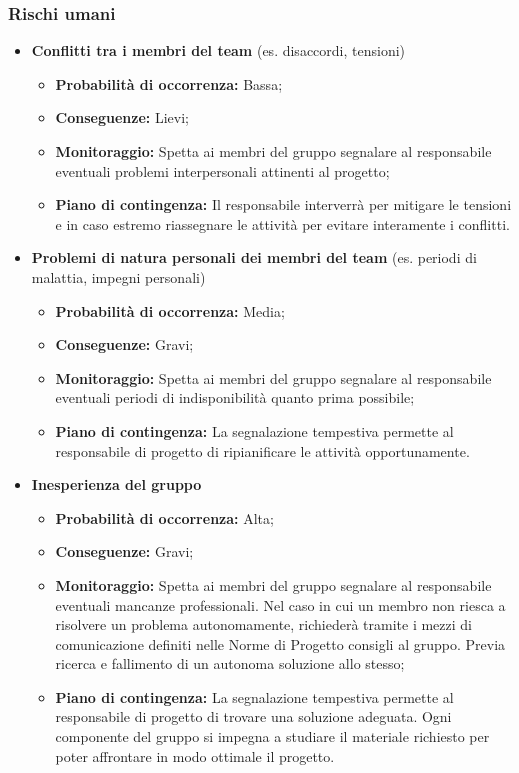 	\subsubsection{Rischi umani}
		\begin{itemize}
			\item \textbf{Conflitti tra i membri del team} (es. disaccordi, tensioni)
				\begin{itemize}
					\item \textbf{Probabilità di occorrenza:} Bassa;
					\item \textbf{Conseguenze:} Lievi;
					\item \textbf{Monitoraggio:} Spetta ai membri del gruppo segnalare al responsabile eventuali problemi interpersonali attinenti al progetto;
					\item \textbf{Piano di contingenza:} Il responsabile interverrà per mitigare le tensioni e in caso estremo riassegnare le attività per evitare interamente i conflitti.
				\end{itemize}
			\item \textbf{Problemi di natura personali dei membri del team} (es. periodi di malattia, impegni personali)
				\begin{itemize}
					\item \textbf{Probabilità di occorrenza:} Media;
					\item \textbf{Conseguenze:} Gravi;
					\item \textbf{Monitoraggio:} Spetta ai membri del gruppo segnalare al responsabile eventuali periodi di indisponibilità quanto prima possibile;
					\item \textbf{Piano di contingenza:} La segnalazione tempestiva permette al responsabile di progetto di ripianificare le attività opportunamente.
				\end{itemize}
			\item \textbf{Inesperienza del gruppo}
				\begin{itemize}
					\item \textbf{Probabilità di occorrenza:} Alta;
					\item \textbf{Conseguenze:} Gravi;
					\item \textbf{Monitoraggio:} Spetta ai membri del gruppo segnalare al responsabile eventuali mancanze professionali. Nel caso in cui un membro non riesca a risolvere un problema autonomamente, richiederà tramite i mezzi di comunicazione definiti nelle Norme di Progetto consigli al gruppo. Previa ricerca e fallimento di un autonoma soluzione allo stesso;
					\item \textbf{Piano di contingenza:} La segnalazione tempestiva permette al responsabile di progetto di trovare una soluzione adeguata. Ogni componente del gruppo si impegna a studiare il materiale richiesto per poter affrontare in modo ottimale il progetto.
				\end{itemize}
		\end{itemize}
